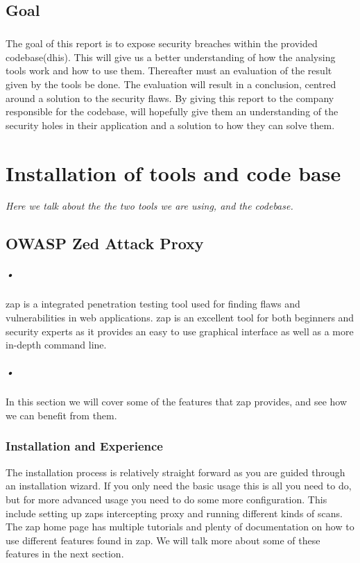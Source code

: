 \documentclass[11pt,english,a4paper]{report}
\begin{document}
\section{Goal}
\paragraph{}
The goal of this report is to expose security breaches within the provided codebase(\gls{dhis}). This will give us a better understanding of how the analysing tools work and how to use them. Thereafter must an evaluation of the result given by the tools be done. The evaluation will result in a conclusion, centred around a solution to the security flaws. By giving this report to the company responsible for the codebase, will hopefully give them an understanding of the security holes in their application and a solution to how they can solve them.

\chapter{Installation of tools and code base}
\textit{Here we talk about the the two tools we are using, and the codebase.}
\section{OWASP Zed Attack Proxy}
\paragraph{•}
\gls{zap} is a integrated penetration testing tool used for finding flaws and vulnerabilities in web applications. \gls{zap} is an excellent tool for both beginners and security experts as it provides an easy to use graphical interface as well as a more in-depth command line.
\paragraph{•}
In this section we will cover some of the features that \gls{zap} provides, and see how we can benefit from them.
\subsection{Installation and Experience}
The installation process is relatively straight forward as you are guided through an installation wizard. If you only need the basic usage this is all you need to do, but for more advanced usage you need to do some more configuration. This include setting up \gls{zap}s intercepting proxy and running different kinds of scans. The \gls{zap} home page has multiple tutorials and plenty of documentation on how to use different features found in \gls{zap}. We will talk more about some of these features in the next section.
\end{document}
